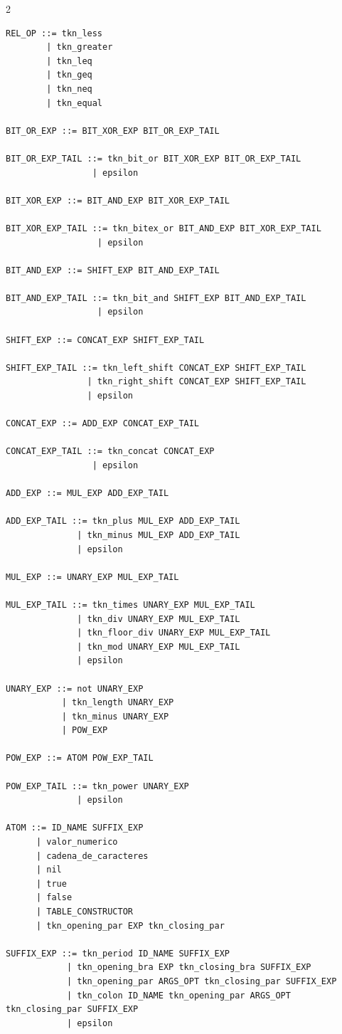 \documentclass[10pt,letterpaper]{article}
\begin{document}
\begin{multicols}{2}
\begin{lstlisting}[style=grammarstyle]
REL_OP ::= tkn_less
        | tkn_greater
        | tkn_leq
        | tkn_geq
        | tkn_neq
        | tkn_equal

BIT_OR_EXP ::= BIT_XOR_EXP BIT_OR_EXP_TAIL

BIT_OR_EXP_TAIL ::= tkn_bit_or BIT_XOR_EXP BIT_OR_EXP_TAIL
                 | epsilon

BIT_XOR_EXP ::= BIT_AND_EXP BIT_XOR_EXP_TAIL

BIT_XOR_EXP_TAIL ::= tkn_bitex_or BIT_AND_EXP BIT_XOR_EXP_TAIL
                  | epsilon

BIT_AND_EXP ::= SHIFT_EXP BIT_AND_EXP_TAIL

BIT_AND_EXP_TAIL ::= tkn_bit_and SHIFT_EXP BIT_AND_EXP_TAIL
                  | epsilon

SHIFT_EXP ::= CONCAT_EXP SHIFT_EXP_TAIL

SHIFT_EXP_TAIL ::= tkn_left_shift CONCAT_EXP SHIFT_EXP_TAIL
                | tkn_right_shift CONCAT_EXP SHIFT_EXP_TAIL
                | epsilon

CONCAT_EXP ::= ADD_EXP CONCAT_EXP_TAIL

CONCAT_EXP_TAIL ::= tkn_concat CONCAT_EXP
                 | epsilon

ADD_EXP ::= MUL_EXP ADD_EXP_TAIL

ADD_EXP_TAIL ::= tkn_plus MUL_EXP ADD_EXP_TAIL
              | tkn_minus MUL_EXP ADD_EXP_TAIL
              | epsilon

MUL_EXP ::= UNARY_EXP MUL_EXP_TAIL

MUL_EXP_TAIL ::= tkn_times UNARY_EXP MUL_EXP_TAIL
              | tkn_div UNARY_EXP MUL_EXP_TAIL
              | tkn_floor_div UNARY_EXP MUL_EXP_TAIL
              | tkn_mod UNARY_EXP MUL_EXP_TAIL
              | epsilon

UNARY_EXP ::= not UNARY_EXP
           | tkn_length UNARY_EXP
           | tkn_minus UNARY_EXP
           | POW_EXP

POW_EXP ::= ATOM POW_EXP_TAIL

POW_EXP_TAIL ::= tkn_power UNARY_EXP
              | epsilon

ATOM ::= ID_NAME SUFFIX_EXP
      | valor_numerico
      | cadena_de_caracteres
      | nil
      | true
      | false
      | TABLE_CONSTRUCTOR
      | tkn_opening_par EXP tkn_closing_par

SUFFIX_EXP ::= tkn_period ID_NAME SUFFIX_EXP
            | tkn_opening_bra EXP tkn_closing_bra SUFFIX_EXP
            | tkn_opening_par ARGS_OPT tkn_closing_par SUFFIX_EXP
            | tkn_colon ID_NAME tkn_opening_par ARGS_OPT tkn_closing_par SUFFIX_EXP
            | epsilon


\end{lstlisting}
\end{multicols}
\end{document}
